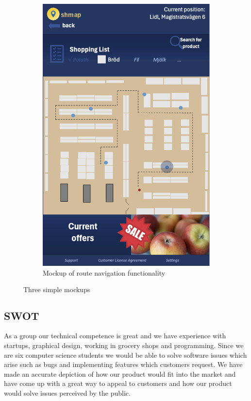 \documentclass[titlepage]{article}
\begin{document}
\begin{figure}[h!]
\begin{subfigure}[b]{0.3\linewidth}
      \includegraphics[width=\textwidth]{ShopRoute.png}
    \caption{Mockup of route navigation functionality}
      \end{subfigure}
    \caption{Three simple mockups}
    \label{fig:mockups}
\end{figure}

\subsection{SWOT}
As a group our technical competence is great and we have experience with startups, graphical design, working in grocery shops and programming. Since we are six computer science students we would be able to solve software issues which arise such as bugs and implementing features which customers request. We have made an accurate depiction of how our product would fit into the market and have come up with a great way to appeal to customers and how our product would solve issues perceived by the public.
\end{document}
